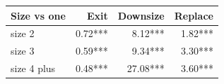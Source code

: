 \begin{tabular}{lrrr}
\toprule
Size vs one & Exit & Downsize & Replace \\
\midrule
size 2 & 0.72*** & 8.12*** & 1.82*** \\
size 3 & 0.59*** & 9.34*** & 3.30*** \\
size 4 plus & 0.48*** & 27.08*** & 3.60*** \\
\bottomrule
\end{tabular}
